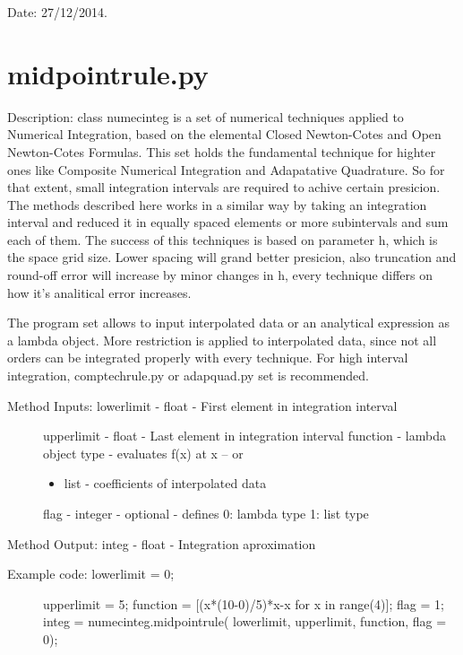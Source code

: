 \documentclass[letterpaper,10pt,oneside]{sphinxmanual}
\theoremstyle{plain}%
\theoremstyle{definition}%
\theoremstyle{remark}%
\begin{document}
Date: 27/12/2014.


\section{midpointrule.py}
\label{code:module-midpointrule}\label{code:midpointrule-py}
Description: class numecinteg is a set of numerical techniques applied to
Numerical Integration, based on the elemental Closed Newton-Cotes and
Open Newton-Cotes Formulas. This set holds the fundamental technique for
highter ones like Composite Numerical Integration and Adapatative Quadrature.
So for that extent, small integration intervals are required to achive certain
presicion. The methods described here works in a similar way by taking an
integration interval and reduced it in equally spaced elements or more 
subintervals and sum each of them. The success of this techniques is based
on parameter h, which is the space grid size. Lower spacing will grand better
presicion, also truncation and round-off error will increase by minor changes
in h, every technique differs on how it's analitical error increases.

The program set allows to input interpolated data or an analytical expression
as a lambda object. More restriction is applied to interpolated data, since
not all orders can be integrated properly with every technique. For high 
interval integration, comptechrule.py or adapquad.py set is recommended.
\begin{description}
\item[{Method Inputs: lowerlimit - float - First element in integration interval}] \leavevmode
upperlimit - float - Last element in integration interval
function - lambda object type - evaluates f(x) at x -- or
\begin{itemize}
\item {} 
list - coefficients of interpolated data

\end{itemize}

flag - integer - optional - defines 0: lambda type 1: list type

\end{description}

Method Output: integ - float - Integration aproximation
\begin{description}
\item[{Example code: lowerlimit = 0;}] \leavevmode
upperlimit = 5;
function = {[}(x*(10-0)/5)*x-x for x in range(4){]};
flag = 1;
integ =                   numecinteg.midpointrule(
lowerlimit, upperlimit, function, flag = 0);

\end{description}
\end{document}
